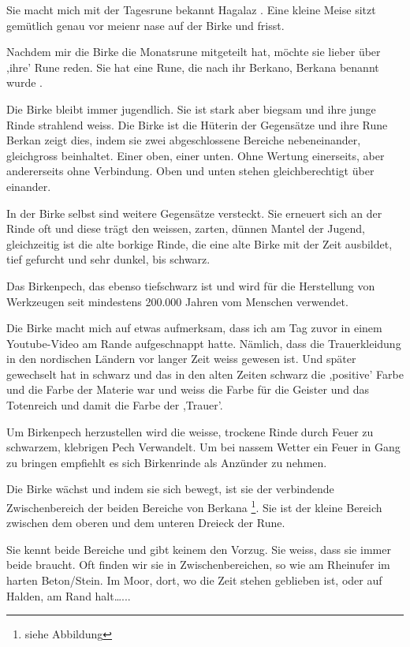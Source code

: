 \documentclass[11pt,titlepage,a5paper]{book}
\begin{document}
Sie macht mich mit der Tagesrune bekannt Hagalaz . Eine kleine Meise sitzt gemütlich genau vor meienr nase auf der Birke und frisst.

Nachdem mir die Birke die Monatsrune mitgeteilt hat, möchte sie lieber über ,ihre' Rune reden. Sie hat eine Rune, die nach ihr Berkano, Berkana benannt wurde .

Die Birke bleibt immer jugendlich. Sie ist stark aber biegsam und ihre junge Rinde strahlend weiss. Die Birke ist die Hüterin der Gegensätze und ihre Rune Berkan  zeigt dies, indem sie zwei abgeschlossene Bereiche nebeneinander, gleichgross beinhaltet. Einer oben, einer unten. Ohne Wertung einerseits, aber andererseits ohne Verbindung. Oben und unten stehen gleichberechtigt über einander.

In der Birke selbst sind weitere Gegensätze versteckt. Sie erneuert sich an der Rinde oft und diese trägt den weissen, zarten, dünnen Mantel der Jugend, gleichzeitig ist die alte borkige Rinde, die eine alte Birke mit der Zeit ausbildet, tief gefurcht und sehr dunkel, bis schwarz. 

Das Birkenpech, das ebenso tiefschwarz ist und wird für die Herstellung von Werkzeugen seit mindestens 200.000 Jahren vom Menschen verwendet.

Die Birke macht mich auf etwas aufmerksam, dass ich am Tag zuvor in einem Youtube-Video am Rande aufgeschnappt hatte. Nämlich, dass die Trauerkleidung in den nordischen Ländern vor langer Zeit weiss gewesen ist. Und später gewechselt hat in schwarz und das in den alten Zeiten schwarz die ,positive' Farbe und die Farbe der Materie war und weiss die Farbe für die Geister und das Totenreich und damit die Farbe der ,Trauer'.

Um Birkenpech herzustellen wird die weisse, trockene Rinde durch Feuer zu schwarzem, klebrigen Pech Verwandelt. Um bei nassem Wetter ein Feuer in Gang zu bringen empfiehlt es sich Birkenrinde als Anzünder zu nehmen. 

Die Birke wächst und indem sie sich bewegt, ist sie der verbindende Zwischenbereich der beiden Bereiche von Berkana  \footnote{siehe Abbildung}. Sie ist der kleine Bereich zwischen dem oberen und dem unteren Dreieck der Rune.

Sie kennt beide Bereiche und gibt keinem den Vorzug. Sie weiss, dass sie immer beide braucht. Oft finden wir sie in Zwischenbereichen, so wie am Rheinufer im harten Beton/Stein. Im Moor, dort, wo die Zeit stehen geblieben ist, oder auf Halden, am Rand halt\dots...
\end{document}
